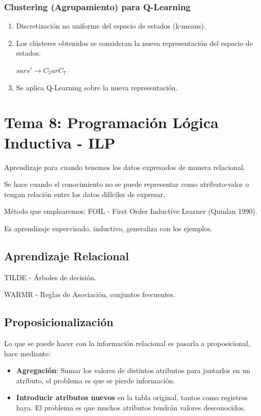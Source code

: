 \documentclass[12pt, twoside, openright]{report} %
\begin{document}
\subsection{Clustering (Agrupamiento) para Q-Learning}
\begin{enumerate}
	\item Discretización no uniforme del espacio de estados (k-means).
	\item Los clústeres obtenidos se consideran la nueva representación del espacio de estados.

	      $sars' \rightarrow C_5arC_7$
	\item Se aplica Q-Learning sobre la nueva representación.
\end{enumerate}

\chapter{Tema 8: Programación Lógica Inductiva - ILP}
Aprendizaje para cuando tenemos los datos expresados de manera relacional.

Se hace cuando el conocimiento no se puede representar como atributo-valor o tengan relación entre los datos difíciles de expresar.

Método que emplearemos: FOIL - First Order Inductive Learner (Quinlan 1990).

Es aprendizaje supervisado, inductivo, generaliza con los ejemplos.

\section{Aprendizaje Relacional}
TILDE - Árboles de decisión.

WARMR - Reglas de Asociación, conjuntos frecuentes.

\section{Proposicionalización}
Lo que se puede hacer con la información relacional es pasarla a proposicional, hace mediante:
\begin{itemize}
	\item \textbf{Agregación}: Sumar los valores de distintos atributos para juntarlos en un atributo, el problema es que se pierde información.
	\item \textbf{Introducir atributos nuevos} en la tabla original, tantos como registros haya. El problema es que muchos atributos tendrán valores desconocidos.
\end{itemize}
\end{document}
